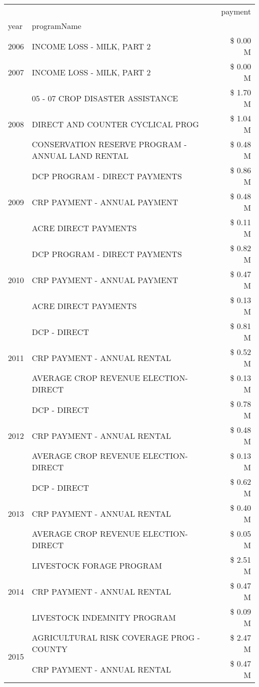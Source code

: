 \begin{tabular}{llr}
\toprule
 &  & payment \\
year & programName &  \\
\midrule
2006 & INCOME LOSS - MILK, PART 2 & \$ 0.00 M \\
\cline{1-3}
2007 & INCOME LOSS - MILK, PART 2 & \$ 0.00 M \\
\cline{1-3}
\multirow[t]{3}{*}{2008} & 05 - 07 CROP DISASTER ASSISTANCE & \$ 1.70 M \\
 & DIRECT AND COUNTER CYCLICAL PROG & \$ 1.04 M \\
 & CONSERVATION RESERVE PROGRAM - ANNUAL LAND RENTAL & \$ 0.48 M \\
\cline{1-3}
\multirow[t]{3}{*}{2009} & DCP PROGRAM - DIRECT PAYMENTS & \$ 0.86 M \\
 & CRP PAYMENT - ANNUAL PAYMENT & \$ 0.48 M \\
 & ACRE DIRECT PAYMENTS & \$ 0.11 M \\
\cline{1-3}
\multirow[t]{3}{*}{2010} & DCP PROGRAM - DIRECT PAYMENTS & \$ 0.82 M \\
 & CRP PAYMENT - ANNUAL PAYMENT & \$ 0.47 M \\
 & ACRE DIRECT PAYMENTS & \$ 0.13 M \\
\cline{1-3}
\multirow[t]{3}{*}{2011} & DCP - DIRECT & \$ 0.81 M \\
 & CRP PAYMENT - ANNUAL RENTAL & \$ 0.52 M \\
 & AVERAGE CROP REVENUE ELECTION-DIRECT & \$ 0.13 M \\
\cline{1-3}
\multirow[t]{3}{*}{2012} & DCP - DIRECT & \$ 0.78 M \\
 & CRP PAYMENT - ANNUAL RENTAL & \$ 0.48 M \\
 & AVERAGE CROP REVENUE ELECTION-DIRECT & \$ 0.13 M \\
\cline{1-3}
\multirow[t]{3}{*}{2013} & DCP - DIRECT & \$ 0.62 M \\
 & CRP PAYMENT - ANNUAL RENTAL & \$ 0.40 M \\
 & AVERAGE CROP REVENUE ELECTION-DIRECT & \$ 0.05 M \\
\cline{1-3}
\multirow[t]{3}{*}{2014} & LIVESTOCK FORAGE PROGRAM & \$ 2.51 M \\
 & CRP PAYMENT - ANNUAL RENTAL & \$ 0.47 M \\
 & LIVESTOCK INDEMNITY PROGRAM & \$ 0.09 M \\
\cline{1-3}
\multirow[t]{3}{*}{2015} & AGRICULTURAL RISK COVERAGE PROG - COUNTY & \$ 2.47 M \\
 & CRP PAYMENT - ANNUAL RENTAL & \$ 0.47 M \\

\end{tabular}
